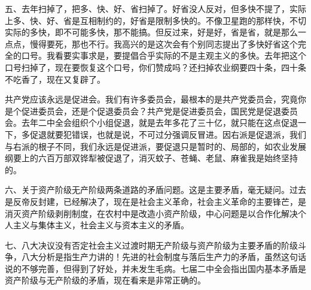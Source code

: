 五、去年扫掉了，把多、快、好、省扫掉了。好省没人反对，但多快不提了，实际上多、快、好、省是互相制约的，好省是限制多快的。不像卫星跑的那样快，不切实际的多快，即不可能多快，那不能搞。但反过来，好是好，省是省，就是那么一点点，慢得要死，那也不行。我高兴的是这次会有个别同志提出了多快好省这个完全的口号。我看要实事求是，要提倡合乎实际的不是主观主义的多快。去年把这个口号扫掉了，现在要恢复这个口号，你们赞成吗？还扫掉农业纲要四十条，四十条不吃香了，现在又复辟了。

共产党应该永远是促进会。我们有许多委员会，最根本的是共产党委员会，究竟你是个促进委员会，还是个促退委员会？共产党是促进委员会，国民党是促退委员会。去年二中全会组织个小组促退，就是去年多花了三十亿，就只能在这点促退一下，多促退就要犯错误，也就是说，不可过分强调反冒进。因右派是促退派，我们与右派的根子不同，我们永远是促进派，要促退只是暂时的、局部的，如农业发展纲要上的六百万部双铧犁被促退了，消灭蚊子、苍蝇、老鼠、麻雀我是始终坚持的。

六、关于资产阶级无产阶级两条道路的矛盾问题。这是主要矛盾，毫无疑问。过去是反帝反封建，已经解决了，现在是社会主义革命，社会主义革命的主要锋芒，是消灭资产阶级剥削制度，在农村中是改造小资产阶级，中心问题是以合作化解决个人主义与集体主义，社会主义与资本主义的矛盾。

七、八大决议没有否定社会主义过渡时期无产阶级与资产阶级为主要矛盾的阶级斗争，八大分析是指生产力讲的！先进的社会制度与落后生产力的矛盾，虽然这句话说的不够完善，但得到了好处，并未发生毛病。七届二中全会指出国内基本矛盾是资产阶级与无产阶级的矛盾，现在看来是非常正确的。


